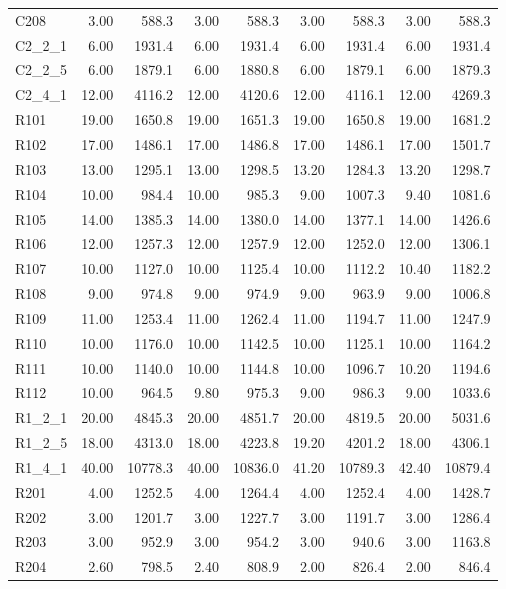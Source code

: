 \documentclass{article}
\begin{document}
{\begin{longtable}{l r r r r r r r r }
C208 & 3.00 & 588.3 & 3.00 & 588.3 & 3.00 & 588.3 & 3.00 & 588.3 \\
C2\_2\_1 & 6.00 & 1931.4 & 6.00 & 1931.4 & 6.00 & 1931.4 & 6.00 & 1931.4 \\
C2\_2\_5 & 6.00 & 1879.1 & 6.00 & 1880.8 & 6.00 & 1879.1 & 6.00 & 1879.3 \\
C2\_4\_1 & 12.00 & 4116.2 & 12.00 & 4120.6 & 12.00 & 4116.1 & 12.00 & 4269.3 \\
R101 & 19.00 & 1650.8 & 19.00 & 1651.3 & 19.00 & 1650.8 & 19.00 & 1681.2 \\
R102 & 17.00 & 1486.1 & 17.00 & 1486.8 & 17.00 & 1486.1 & 17.00 & 1501.7 \\
R103 & 13.00 & 1295.1 & 13.00 & 1298.5 & 13.20 & 1284.3 & 13.20 & 1298.7 \\
R104 & 10.00 & 984.4 & 10.00 & 985.3 & 9.00 & 1007.3 & 9.40 & 1081.6 \\
R105 & 14.00 & 1385.3 & 14.00 & 1380.0 & 14.00 & 1377.1 & 14.00 & 1426.6 \\
R106 & 12.00 & 1257.3 & 12.00 & 1257.9 & 12.00 & 1252.0 & 12.00 & 1306.1 \\
R107 & 10.00 & 1127.0 & 10.00 & 1125.4 & 10.00 & 1112.2 & 10.40 & 1182.2 \\
R108 & 9.00 & 974.8 & 9.00 & 974.9 & 9.00 & 963.9 & 9.00 & 1006.8 \\
R109 & 11.00 & 1253.4 & 11.00 & 1262.4 & 11.00 & 1194.7 & 11.00 & 1247.9 \\
R110 & 10.00 & 1176.0 & 10.00 & 1142.5 & 10.00 & 1125.1 & 10.00 & 1164.2 \\
R111 & 10.00 & 1140.0 & 10.00 & 1144.8 & 10.00 & 1096.7 & 10.20 & 1194.6 \\
R112 & 10.00 & 964.5 & 9.80 & 975.3 & 9.00 & 986.3 & 9.00 & 1033.6 \\
R1\_2\_1 & 20.00 & 4845.3 & 20.00 & 4851.7 & 20.00 & 4819.5 & 20.00 & 5031.6 \\
R1\_2\_5 & 18.00 & 4313.0 & 18.00 & 4223.8 & 19.20 & 4201.2 & 18.00 & 4306.1 \\
R1\_4\_1 & 40.00 & 10778.3 & 40.00 & 10836.0 & 41.20 & 10789.3 & 42.40 & 10879.4 \\
R201 & 4.00 & 1252.5 & 4.00 & 1264.4 & 4.00 & 1252.4 & 4.00 & 1428.7 \\
R202 & 3.00 & 1201.7 & 3.00 & 1227.7 & 3.00 & 1191.7 & 3.00 & 1286.4 \\
R203 & 3.00 & 952.9 & 3.00 & 954.2 & 3.00 & 940.6 & 3.00 & 1163.8 \\
R204 & 2.60 & 798.5 & 2.40 & 808.9 & 2.00 & 826.4 & 2.00 & 846.4 \\

\end{longtable}}
\end{document}
